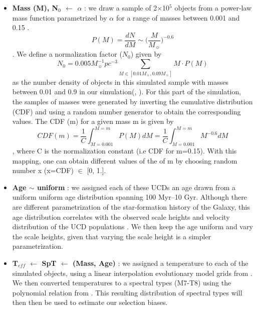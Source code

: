\documentclass[manuscript]{aastex63}
\begin{document}
\begin{itemize}
\item \textbf{Mass (M), N$_0$ $\leftarrow$ $\alpha$ }: we draw a sample of 2$\times$10$^5$ objects from a power-law mass function parametrized by $\alpha$ for a range of masses between 0.001 \Msun and 0.15 \Msun. \begin{equation}  P(M) = \frac{dN}{dM} \sim \biggl( \frac{M}{M_\sun}\biggl)^{-0.6}\end{equation}. We define a normalization factor ($N_0$) given by \begin{equation} N_0 = 0.005 M_\sun^{-1}pc^{-3} \sum_{ M \in [0.01 M_\sun, 0.09 M_\sun] } M \cdot P(M) \end{equation} as the number density of objects in this simulated sample with masses between 0.01 and 0.9 in our simulation(\citealt{1999ApJ...521..613R}, \citealt{2001ApJ...554.1274C}). For this part of the simulation, the samples of masses were generated by inverting the cumulative distribution (CDF) and using a random number generator to obtain the corresponding values. The CDF (m) for a given mass m is given by \begin{equation} CDF(m) = \frac{1}{C} \int _{M=0.001} ^ {M=m} P(M) dM = \frac{1}{C} \int _{M=0.001} ^ {M=m} M^{-0.6} dM\end{equation}, where C is the normalization constant (i.e CDF for m=0.15). With this mapping, one can obtain different values of the of m by choosing random number x (x=CDF) $\in$ [0, 1.]. 

\item \textbf{Age $\sim$ uniform }: we assigned each of these UCDs an age drawn from a uniform uniform age distribution spanning 100 Myr--10 Gyr. Although there are different parametrization of the star-formation history of the Galaxy, this age distribution correlates with the observed scale heights and velocity distribution of the UCD populations \citep{Ryan2017,2010ApJ...718.1171R,2009MNRAS.397.1286A}. We then keep the age uniform and vary the scale heights, given that varying the scale height is a simpler parametrization. 


\item \textbf{T$_{eff}$ $\leftarrow$ SpT  $\leftarrow$ (Mass, Age) }: we assigned a temperature to each of the simulated objects, using a linear interpolation evolutionary model grids from \cite{2003IAUS..211...41B}. We then converted temperatures to a spectral types (M7-T8) using the polynomial relation from \cite{Filippazzo2015}. This resulting distribution of spectral types will then then be used to estimate our selection biases.

\end{itemize}
\end{document}
